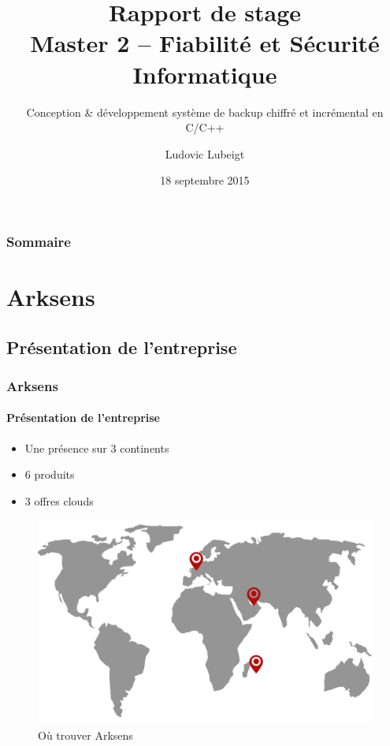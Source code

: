\documentclass{beamer}
\title{Rapport de stage \\Master 2 -- Fiabilité et Sécurité Informatique}
\subtitle{Conception \&  d\'eveloppement syst\`eme de backup chiffr\'e et
incr\'emental en C/C++}
\author{Ludovic Lubeigt}
\institute{Aix-Marseille University}
\date{18 septembre 2015}
\begin{document}
\begin{frame}
 \titlepage
\end{frame}

\begin{frame}
 \frametitle{Sommaire}
 \tableofcontents
\end{frame}

\section{Arksens}
\subsection{Pr\'esentation de l'entreprise}
\begin{frame}
 \frametitle{Arksens}
 \framesubtitle{Pr\'esentation de l'entreprise}
 \begin{minipage}{0.49\textwidth}
  \begin{itemize}
    \item Une pr\'esence sur 3 continents
    \item 6 produits
    \item 3 offres clouds
  \end{itemize}
 \end{minipage}
 \begin{minipage}{0.49\textwidth}
  \begin{figure}[h!]
    \centering
    \includegraphics[scale=0.15]{map_arksens.png}
    \caption{\label{mapArksens} O\`u trouver Arksens}
  \end{figure}
 \end{minipage}
\end{frame}
\end{document}

